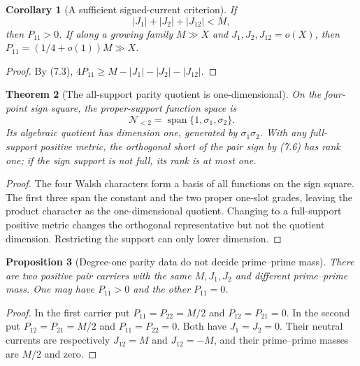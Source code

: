 \documentclass[11pt]{article}
\newtheorem{theorem}{Theorem}[section]
\newtheorem{proposition}[theorem]{Proposition}
\newtheorem{corollary}[theorem]{Corollary}
\theoremstyle{definition}
\theoremstyle{remark}
\newcommand{\Span}{\operatorname{span}}
\newcommand{\abs}[1]{\left\lvert#1\right\rvert}
\begin{document}
\begin{corollary}[A sufficient signed-current criterion]
\label{cor:current-sufficient}
If
\[
 \boxed{\abs{J_1}+\abs{J_2}+\abs{J_{12}}<M,}
 \tag{7.5}
\]
then $P_{11}>0$.  If along a growing family
$M\gg X$ and $J_1,J_2,J_{12}=o(X)$, then
$P_{11}=(1/4+o(1))M\gg X$.
\end{corollary}

\begin{proof}
By \textup{(7.3)},
$4P_{11}\ge M-|J_1|-|J_2|-|J_{12}|$.
\end{proof}

\begin{theorem}[The all-support parity quotient is one-dimensional]
\label{thm:parity-one-line}
On the four-point sign square, the proper-support function space is
\[
 \mathcal N_{<2}=\Span\{1,\sigma_1,\sigma_2\}.
 \tag{7.6}
\]
Its algebraic quotient has dimension one, generated by
$\sigma_1\sigma_2$.  With any full-support positive metric, the orthogonal
short of the pair sign by \textup{(7.6)} has rank one; if the sign support is
not full, its rank is at most one.
\end{theorem}

\begin{proof}
The four Walsh characters form a basis of all functions on the sign square.
The first three span the constant and the two proper one-slot grades, leaving
the product character as the one-dimensional quotient.  Changing to a
full-support positive metric changes the orthogonal representative but not the
quotient dimension.  Restricting the support can only lower dimension.
\end{proof}

\begin{proposition}[Degree-one parity data do not decide prime--prime mass]
\label{cth:degree-one-parity}
There are two positive pair carriers with the same $M,J_1,J_2$ and different
prime--prime mass.  One may have $P_{11}>0$ and the other $P_{11}=0$.
\end{proposition}

\begin{proof}
In the first carrier put
$P_{11}=P_{22}=M/2$ and $P_{12}=P_{21}=0$.  In the second put
$P_{12}=P_{21}=M/2$ and $P_{11}=P_{22}=0$.  Both have $J_1=J_2=0$.  Their
neutral currents are respectively $J_{12}=M$ and $J_{12}=-M$, and their
prime--prime masses are $M/2$ and zero.
\end{proof}
\end{document}
